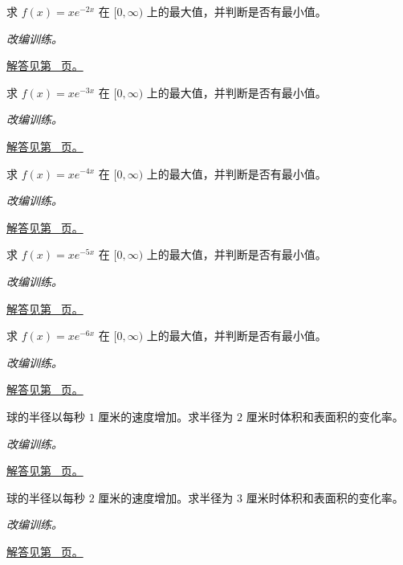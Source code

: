 \documentclass[12pt,fontset=fandol]{ctexart}
\begin{document}
\begin{example}[指数衰减与内点最大值]\label{ex:c11q15}
求 $f(x)=xe^{-2x}$ 在 $[0,\infty)$ 上的最大值，并判断是否有最小值。
\par\textit{改编训练。}\par\hyperref[ans:c11q15]{解答见第~\pageref{ans:c11q15} 页。}
\end{example}
\begin{example}[指数衰减与内点最大值]\label{ex:c11q16}
求 $f(x)=xe^{-3x}$ 在 $[0,\infty)$ 上的最大值，并判断是否有最小值。
\par\textit{改编训练。}\par\hyperref[ans:c11q16]{解答见第~\pageref{ans:c11q16} 页。}
\end{example}
\begin{example}[指数衰减与内点最大值]\label{ex:c11q17}
求 $f(x)=xe^{-4x}$ 在 $[0,\infty)$ 上的最大值，并判断是否有最小值。
\par\textit{改编训练。}\par\hyperref[ans:c11q17]{解答见第~\pageref{ans:c11q17} 页。}
\end{example}
\begin{example}[指数衰减与内点最大值]\label{ex:c11q18}
求 $f(x)=xe^{-5x}$ 在 $[0,\infty)$ 上的最大值，并判断是否有最小值。
\par\textit{改编训练。}\par\hyperref[ans:c11q18]{解答见第~\pageref{ans:c11q18} 页。}
\end{example}
\begin{example}[指数衰减与内点最大值]\label{ex:c11q19}
求 $f(x)=xe^{-6x}$ 在 $[0,\infty)$ 上的最大值，并判断是否有最小值。
\par\textit{改编训练。}\par\hyperref[ans:c11q19]{解答见第~\pageref{ans:c11q19} 页。}
\end{example}
\begin{example}[相关变化率中的链式法则]\label{ex:c11q20}
球的半径以每秒 $1$ 厘米的速度增加。求半径为 $2$ 厘米时体积和表面积的变化率。
\par\textit{改编训练。}\par\hyperref[ans:c11q20]{解答见第~\pageref{ans:c11q20} 页。}
\end{example}
\begin{example}[相关变化率中的链式法则]\label{ex:c11q21}
球的半径以每秒 $2$ 厘米的速度增加。求半径为 $3$ 厘米时体积和表面积的变化率。
\par\textit{改编训练。}\par\hyperref[ans:c11q21]{解答见第~\pageref{ans:c11q21} 页。}
\end{example}
\end{document}
